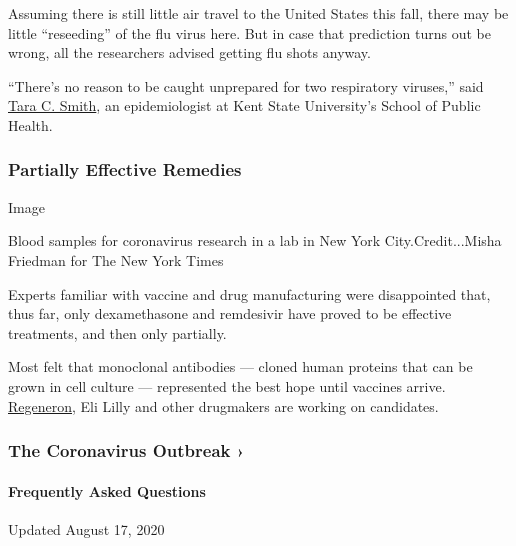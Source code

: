 Assuming there is still little air travel to the United States this
fall, there may be little ``reseeding'' of the flu virus here. But in
case that prediction turns out be wrong, all the researchers advised
getting flu shots anyway.

``There's no reason to be caught unprepared for two respiratory
viruses,'' said
\href{https://www.kent.edu/publichealth/profile/tara-c-smith-phd}{Tara
C. Smith}, an epidemiologist at Kent State University's School of Public
Health.

\hypertarget{partially-effective-remedies}{%
\subsubsection{Partially Effective
Remedies}\label{partially-effective-remedies}}

Image

Blood samples for coronavirus research in a lab in New York
City.Credit...Misha Friedman for The New York Times

Experts familiar with vaccine and drug manufacturing were disappointed
that, thus far, only dexamethasone and remdesivir have proved to be
effective treatments, and then only partially.

Most felt that monoclonal antibodies --- cloned human proteins that can
be grown in cell culture --- represented the best hope until vaccines
arrive.
\href{https://www.nytimes3xbfgragh.onion/2020/07/09/health/regeneron-monoclonal-antibodies.html}{Regeneron},
Eli Lilly and other drugmakers are working on candidates.

\href{https://www.nytimes3xbfgragh.onion/news-event/coronavirus?action=click\&pgtype=Article\&state=default\&region=MAIN_CONTENT_3\&context=storylines_faq}{}

\hypertarget{the-coronavirus-outbreak-}{%
\subsubsection{The Coronavirus Outbreak
›}\label{the-coronavirus-outbreak-}}

\hypertarget{frequently-asked-questions}{%
\paragraph{Frequently Asked
Questions}\label{frequently-asked-questions}}

Updated August 17, 2020

